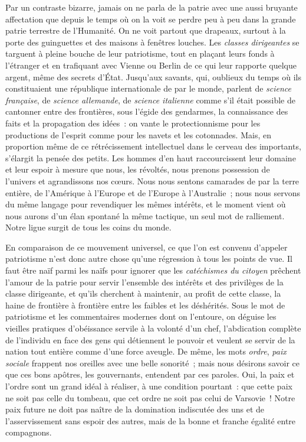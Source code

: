 \documentclass[french,twoside]{book} %
\newcommand\chapterclose{} %
\begin{document}
Par un contraste bizarre, jamais on ne parla de la patrie avec une aussi bruyante affectation que depuis le temps  où on la voit se perdre peu à peu dans la grande patrie terrestre de l’Humanité. On ne voit partout que drapeaux, surtout à la porte des guinguettes et des maisons à fenêtres louches. Les \emph{classes dirigeantes} se targuent à pleine bouche de leur patriotisme, tout en plaçant leurs fonds à l’étranger et en trafiquant avec Vienne ou Berlin de ce qui leur rapporte quelque argent, même des secrets d’État. Jusqu’aux savants, qui, oublieux du temps où ils constituaient une république internationale de par le monde, parlent de \emph{science française}, de \emph{science allemande}, de \emph{science italienne} comme s’il était possible de cantonner entre des frontières, sous l’égide des gendarmes, la connaissance des faits et la  propagation des idées : on vante le protectionnisme pour les productions de l’esprit comme pour les navets et les cotonnades. Mais, en proportion même de ce rétrécissement intellectuel dans le cerveau des importants, s’élargit la pensée des petits. Les hommes d’en haut raccourcissent leur domaine et leur espoir à mesure que nous, les révoltés, nous prenons possession de l’univers et agrandissons nos cœurs. Nous nous sentons camarades de par la terre entière, de l’Amérique à l’Europe et de l’Europe à l’Australie ; nous nous servons du même langage pour revendiquer les mêmes intérêts, et le moment vient où nous aurons d’un élan spontané la même tactique, un seul mot de ralliement. Notre ligue surgit de tous les coins du monde.\par
 En comparaison de ce mouvement universel, ce que l’on est convenu d’appeler patriotisme n’est donc autre chose qu’une régression à tous les points de vue. Il faut être naïf parmi les naïfs pour ignorer que les \emph{catéchismes du citoyen} prêchent l’amour de la patrie pour servir l’ensemble des intérêts et des privilèges de la classe dirigeante, et qu’ils cherchent à maintenir, au profit de cette classe, la haine de frontière à frontière entre les faibles et les déshérités. Sous le mot de patriotisme et les commentaires modernes dont on l’entoure, on déguise les vieilles pratiques d’obéissance servile à la volonté d’un chef, l’abdication complète de l’individu en face des gens qui détiennent le pouvoir et veulent se servir de la nation  tout entière comme d’une force aveugle. De même, les mots \emph{ordre}, \emph{paix sociale} frappent nos oreilles avec une belle sonorité ; mais nous désirons savoir ce que ces bons apôtres, les gouvernants, entendent par ces paroles. Oui, la paix et l’ordre sont un grand idéal à réaliser, à une condition pourtant : que cette paix ne soit pas celle du tombeau, que cet ordre ne soit pas celui de Varsovie ! Notre paix future ne doit pas naître de la domination indiscutée des uns et de l’asservissement sans espoir des autres, mais de la bonne et franche égalité entre compagnons.
\chapterclose
\end{document}
